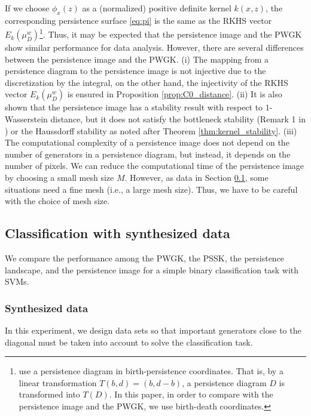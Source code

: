 \documentclass{article}
\begin{document}
If we choose $\phi_{x}(z)$ as a (normalized) positive definite kernel $k(x,z)$, the corresponding persistence surface \eqref{eq:pi} is the same as the RKHS vector $E_{k}(\mu^{w}_{D})$\footnote{\cite{AEKNPSCHMZ17} use a persistence diagram in birth-persistence coordinates. That is, by a linear transformation $T(b,d)=(b,d-b)$, a persistence diagram $D$ is transformed into $T(D)$. In this paper, in order to compare with the persistence image and the PWGK, we use birth-death coordinates.}.
Thus, it may be expected that the persistence image and the PWGK show similar performance for data analysis.
However, there are several differences between the persistence image and the PWGK.
(i) The mapping from a persistence diagram to the persistence image is not injective due to the discretization by the integral, on the other hand, the injectivity of the RKHS vector $E_{k}(\mu^{w}_{D})$ is ensured in Proposition \ref{prop:C0_distance}.
(ii) It is also shown that the persistence image has a stability result with respect to $1$-Wasserstein distance, but it does not satisfy the bottleneck stability (Remark 1 in \cite{AEKNPSCHMZ17}) or the Haussdorff stability as noted after Theorem \ref{thm:kernel_stability}.
(iii) The computational complexity of a persistence image does not depend on the number of generators in a persistence diagram, but instead, it depends on the number of pixels. We can reduce the computational time of the persistence image by choosing a small mesh size $M$. However, as data in Section \ref{subsec:Synthesized}, some situations need a fine mesh (i.e., a large mesh size). Thus, we have to be careful with the choice of mesh size.


\subsection{Classification with synthesized data}
\label{subsec:Synthesized}
We compare the performance among the PWGK, the PSSK, the persistence landscape, and the persistence image for a simple binary classification task with SVMs.

\subsubsection{Synthesized data}  

In this experiment, we design data sets so that important generators close to the diagonal must be taken into account to solve the classification task.
\end{document}
